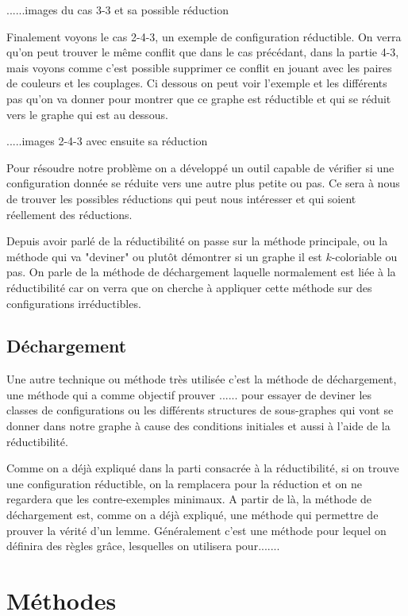\documentclass[10pt,a4paper]{article}
\begin{document}
......images du cas 3-3 et sa possible réduction

Finalement voyons le cas 2-4-3, un exemple de configuration réductible. On verra qu'on peut trouver le même conflit que dans le cas précédant, dans la partie 4-3, mais voyons comme c'est possible supprimer ce conflit en jouant avec les paires de couleurs et les couplages. Ci dessous on peut voir l'exemple et les différents pas qu'on va donner pour montrer que ce graphe est réductible et qui se réduit vers le graphe qui est au dessous.

.....images 2-4-3 avec ensuite sa réduction

Pour résoudre notre problème on a développé un outil capable de vérifier si une configuration donnée se réduite vers une autre plus petite ou pas. Ce sera à nous de trouver les possibles réductions qui peut nous intéresser et qui soient réellement des réductions.

Depuis avoir parlé de la réductibilité on passe sur la méthode principale, ou la méthode qui va "deviner" ou plutôt démontrer si un graphe il est $k$-coloriable ou pas. On parle de la méthode de déchargement laquelle normalement est liée à la réductibilité car on verra que on cherche à appliquer cette méthode sur des configurations irréductibles.



\subsection{Déchargement}

Une autre technique ou méthode très utilisée c'est la méthode de déchargement, une méthode qui a comme objectif prouver ...... pour essayer de deviner les classes de configurations ou les différents structures de sous-graphes qui vont se donner dans notre graphe à cause des conditions initiales et aussi à l'aide de la réductibilité. 

Comme on a déjà expliqué dans la parti consacrée à la réductibilité, si on trouve une configuration réductible, on la remplacera pour la réduction et on ne regardera que les contre-exemples minimaux. A partir de là, la méthode de déchargement est, comme on a déjà expliqué, une méthode qui permettre de prouver la vérité d'un lemme. Généralement c'est une méthode pour lequel on définira des règles grâce, lesquelles on utilisera pour.......




\section{Méthodes}
\end{document}
